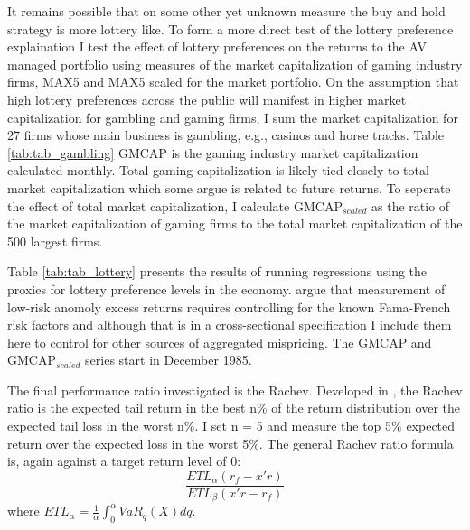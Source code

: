 It remains possible that on some other yet unknown measure the buy and hold strategy is more lottery like. To form a more direct test of the lottery preference explaination I test the effect of lottery preferences on the returns to the AV managed portfolio using measures of the market capitalization of gaming industry firms, MAX5 and MAX5 scaled for the market portfolio. On the assumption that high lottery preferences across the public will manifest in higher market capitalization for gambling and gaming firms, I sum the market capitalization for 27 firms whose main business is gambling, e.g., casinos and horse tracks. Table \ref{tab:tab_gambling} GMCAP is the gaming industry market capitalization calculated monthly. Total gaming capitalization is likely tied closely to total market capitalization which some argue is related to future returns. To seperate the effect of total market capitalization, I calculate GMCAP$_{scaled}$ as the ratio of the market capitalization of gaming firms to the total market capitalization of the 500 largest firms.

Table \ref{tab:tab_lottery} presents the results of running regressions using the proxies for lottery preference levels in the economy. \citet{fama_dissecting_2016} argue that measurement of low-risk anomoly excess returns requires controlling for the known Fama-French risk factors and although that is in a cross-sectional specification I include them here to control for other sources of aggregated mispricing. The GMCAP and GMCAP$_{scaled}$ series start in December 1985.  

The final performance ratio investigated is the Rachev. Developed in \citet{biglova_different_2004}, the Rachev ratio is the expected tail return in the best n\% of the return distribution over the expected tail loss in the worst n\%. I set n = 5 and measure the top 5\% expected return over the expected loss in the worst 5\%. The general Rachev ratio formula is, again against a target return level of 0:
\begin{equation}
\frac {ETL_{\alpha }\left({{r_{f}}-x'r}\right)}{ETL_{\beta}\left({x'r-{r_{f}}}\right)}
\end{equation}
where $ET{L_{\alpha }}={\frac {1}{\alpha }}\int _{0}^{\alpha }{VaR_{q}\left(X\right)dq}$.